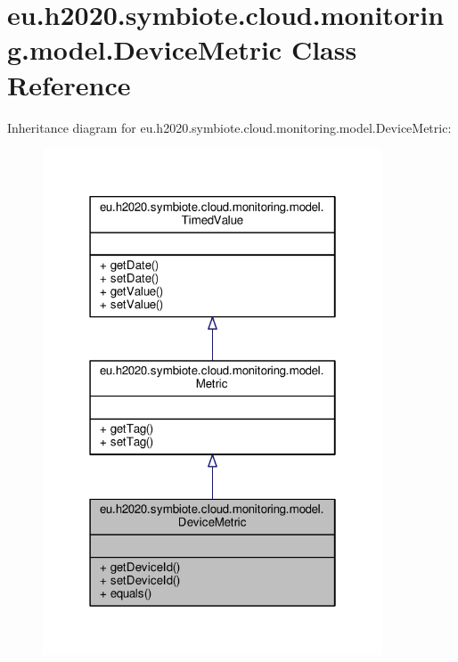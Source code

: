 \hypertarget{classeu_1_1h2020_1_1symbiote_1_1cloud_1_1monitoring_1_1model_1_1DeviceMetric}{}\section{eu.\+h2020.\+symbiote.\+cloud.\+monitoring.\+model.\+Device\+Metric Class Reference}
\label{classeu_1_1h2020_1_1symbiote_1_1cloud_1_1monitoring_1_1model_1_1DeviceMetric}


Inheritance diagram for eu.\+h2020.\+symbiote.\+cloud.\+monitoring.\+model.\+Device\+Metric\+:
\nopagebreak
\begin{figure}[H]
\begin{center}
\leavevmode
\includegraphics[width=286pt]{classeu_1_1h2020_1_1symbiote_1_1cloud_1_1monitoring_1_1model_1_1DeviceMetric__inherit__graph}
\end{center}
\end{figure}


